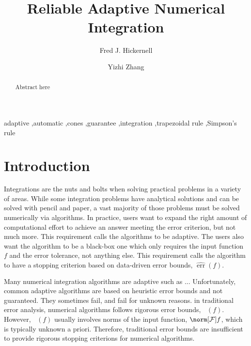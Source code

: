 \documentclass[]{elsarticle}
\DeclareMathOperator{\err}{err}
\newcommand{\herr}{\widehat{\err}}
\theoremstyle{definition}
\theoremstyle{remark}
\DeclareMathOperator{\oerr}{\overline{\err}}
\newcommand{\calf}{{\mathcal{F}}}
\begin{document}
\begin{frontmatter}

\title{Reliable Adaptive Numerical Integration}
\author{Fred J. Hickernell} 
\author{Yizhi Zhang} 
\address{IIT Tower 7th Floor, Illinois Institute of Technology,\\ 10 W.\ 35$^{\text{nd}}$ St., Chicago, IL 60616}
\begin{abstract}
Abstract here
\end{abstract}

\begin{keyword}
adaptive \sep automatic \sep cones \sep  guarantee \sep integration \sep trapezoidal rule \sep Simpson's rule


\end{keyword}
\end{frontmatter}

\section{Introduction}

Integrations are the nuts and bolts when solving practical problems in a variety of areas. While some integration problems have analytical solutions and can be solved with pencil and paper, a vast majority of those problems must be solved numerically via algorithms. In practice, users want to expand the right amount of computational effort to achieve an answer meeting the error criterion, but not much more. This requirement calls the algorithms to be adaptive. The users also want the algorithm to be a black-box one which only requires the input function $f$ and the error tolerance, not anything else. This requirement calls the algorithm to have a stopping criterion based on data-driven error bounds, $\herr(f)$. 

Many numerical integration algorithms are adaptive such as ... Unfortunately, common adaptive algorithms are based on heuristic error bounds and not guaranteed. They sometimes fail, and fail for unknown reasons. in traditional error analysis, numerical algorithms follows rigorous error bounds, $\oerr(f)$. However, $\oerr(f)$ usually involves norms of the input function, $\norm[\calf]{f}$, which is typically unknown a priori. Therefore, traditional error bounds are insufficient to provide rigorous stopping criterions for numerical algorithms.
\end{document}
